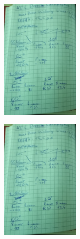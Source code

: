  \begin{minipage}[t]{0.4\textwidth}
    \includegraphics[height=6cm, page=5]{Abbildungen/us3_messdaten.pdf}
 \end{minipage}
 \begin{minipage}[t]{0.4\textwidth}
    \includegraphics[height=6cm, keepaspectratio, page=6]{Abbildungen/us3_messdaten.pdf}
 \end{minipage}
